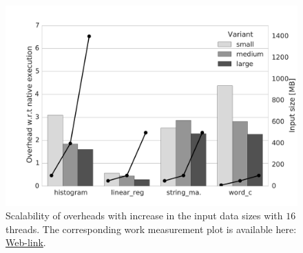 
\begin{figure}[t]
\centering
\includegraphics[scale=0.22]{figure/benchmarks/worksize-times-Total_overheads.pdf}
\caption{Scalability of overheads with increase in the input data sizes with $16$ threads. The corresponding work measurement plot is available here: \href{https://mic92.github.io/inspector/index.html\#graph6}{Web-link}.}
\label{fig:data-size-overheads}
\end{figure}
